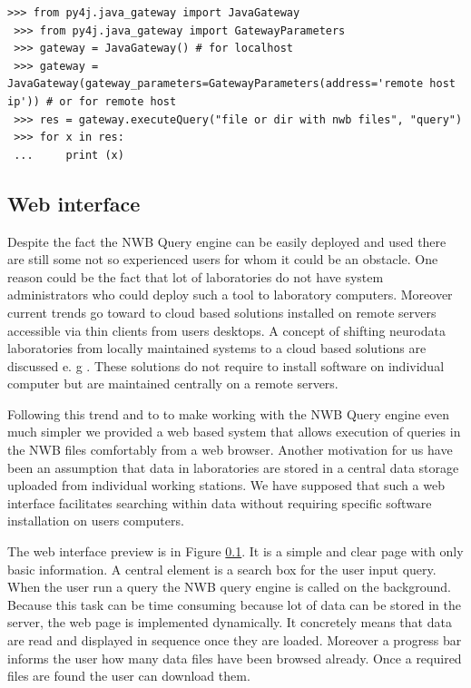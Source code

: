 \documentclass[utf8]{frontiersSCNS} %
\begin{document}
\begin{lstlisting}[caption={\emph{Example of calling the python server.} In the first step a JavaGateway is imported. From this point a JavaGateway can be accessed. When a Java Gateway is created the user can call an executeQuery method with two parameters (1) input file/dir and (2) required query. Next lines are common calling of python code as usual.},label={lst:python_code}]
 >>> from py4j.java_gateway import JavaGateway
 >>> from py4j.java_gateway import GatewayParameters
 >>> gateway = JavaGateway() # for localhost
 >>> gateway = JavaGateway(gateway_parameters=GatewayParameters(address='remote host ip')) # or for remote host
 >>> res = gateway.executeQuery("file or dir with nwb files", "query")
 >>> for x in res:
 ...     print (x)
\end{lstlisting}

\subsection{Web interface}
\label{web_interface}

Despite the fact the NWB Query engine can be easily deployed and used there are still some not so experienced users for whom it could be an obstacle. One reason could be the fact that lot of laboratories do not have system administrators who could deploy such a tool to laboratory computers. Moreover current trends go toward to cloud based solutions installed on remote servers accessible via thin clients from users desktops. A concept of shifting neurodata laboratories from locally maintained systems to a cloud based solutions are discussed e. g \citep{ROSENTHAL2010342}. These solutions do not require to install software on individual computer but are maintained centrally on a remote servers. 

Following this trend and to to make working with the NWB Query engine even much simpler we provided a web based system that allows execution of queries in the NWB files comfortably from a web browser. Another motivation for us have been an assumption that data in laboratories are stored in a central data storage uploaded from individual working stations. We have supposed that such a web interface facilitates searching within data without requiring specific software installation on users computers.

The web interface preview is in Figure \ref{web_interface}. It is a simple and clear page with only basic information. A central element is a search box for the user input query. When the user run a query the NWB query engine is called on the background. Because this task can be time consuming because lot of data can be stored in the server, the web page is implemented dynamically. It concretely means that data are read and displayed in sequence once they are loaded. Moreover a progress bar informs the user how many data files have been browsed already. Once a required files are found the user can download them.
\end{document}
